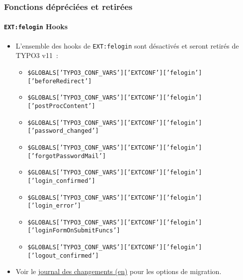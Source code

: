 \begin{frame}[fragile]
	\frametitle{Fonctions dépréciées et retirées}
	\framesubtitle{\texttt{EXT:felogin} Hooks}

	\lstset{basicstyle=\tiny\ttfamily}

	\begin{itemize}
		\item L'ensemble des hooks de \texttt{EXT:felogin} sont désactivés et seront retirés de TYPO3 v11~:

			\begin{itemize}\tiny
				\item \texttt{\$GLOBALS['TYPO3\_CONF\_VARS']['EXTCONF']['felogin']['beforeRedirect']}
				\item \texttt{\$GLOBALS['TYPO3\_CONF\_VARS']['EXTCONF']['felogin']['postProcContent']}
				\item \texttt{\$GLOBALS['TYPO3\_CONF\_VARS']['EXTCONF']['felogin']['password\_changed']}
				\item \texttt{\$GLOBALS['TYPO3\_CONF\_VARS']['EXTCONF']['felogin']['forgotPasswordMail']}
				\item \texttt{\$GLOBALS['TYPO3\_CONF\_VARS']['EXTCONF']['felogin']['login\_confirmed']}
				\item \texttt{\$GLOBALS['TYPO3\_CONF\_VARS']['EXTCONF']['felogin']['login\_error']}
				\item \texttt{\$GLOBALS['TYPO3\_CONF\_VARS']['EXTCONF']['felogin']['loginFormOnSubmitFuncs']}
				\item \texttt{\$GLOBALS['TYPO3\_CONF\_VARS']['EXTCONF']['felogin']['logout\_confirmed']}
			\end{itemize}

		\item Voir le
			\href{https://docs.typo3.org/c/typo3/cms-core/master/en-us/Changelog/10.4/Deprecation-88740-DeprecateFeloginPibasePlugin.html}{journal des changements (en)}
			pour les options de migration.
	\end{itemize}

\end{frame}


